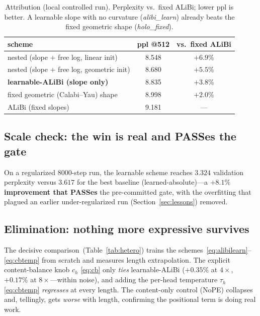 \documentclass[11pt,a4paper]{article}
\begin{document}
\begin{table}[t]
\centering
\caption{Attribution (local controlled run). Perplexity vs.\ fixed ALiBi; lower
ppl is better. A learnable slope with no curvature (\emph{alibi\_learn}) already
beats the fixed geometric shape (\emph{holo\_fixed}).}
\label{tab:attr}
\begin{tabular}{lcc}
\toprule
scheme & ppl @512 & vs.\ fixed ALiBi \\
\midrule
nested (slope $+$ free log, linear init) & 8.548 & $+6.9\%$ \\
nested (slope $+$ free log, geometric init) & 8.680 & $+5.5\%$ \\
\textbf{learnable-ALiBi (slope only)} & 8.835 & $+3.8\%$ \\
fixed geometric (Calabi--Yau) shape & 8.998 & $+2.0\%$ \\
ALiBi (fixed slopes) & 9.181 & --- \\
\bottomrule
\end{tabular}
\end{table}

\subsection{Scale check: the win is real and PASSes the gate}
On a regularized $8000$-step run, the learnable scheme reaches $3.324$ validation
perplexity versus $3.617$ for the best baseline (learned-absolute)---a
\textbf{$+8.1\%$ improvement that PASSes} the pre-committed gate, with the
overfitting that plagued an earlier under-regularized run (Section~\ref{sec:lessons})
removed.

\subsection{Elimination: nothing more expressive survives}
The decisive comparison~(Table~\ref{tab:hetero}) trains the
schemes~\eqref{eq:alibilearn}--\eqref{eq:cbtemp} from scratch and measures length
extrapolation. The explicit content-balance knob $c_h$ \eqref{eq:cb} only
\emph{ties} learnable-ALiBi ($+0.35\%$ at $4\times$, $+0.17\%$ at $8\times$---within
noise), and adding the per-head temperature $\tau_h$ \eqref{eq:cbtemp}
\emph{regresses} at every length. The content-only control (NoPE) collapses and,
tellingly, gets \emph{worse} with length, confirming the positional term is doing
real work.
\end{document}
